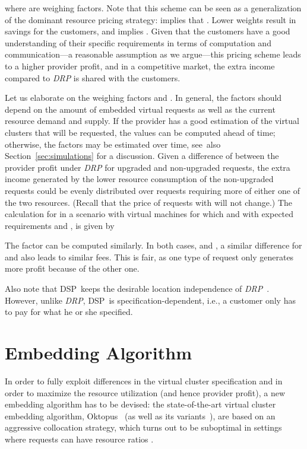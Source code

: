 \documentclass{sig-alternate-per}
\newcommand{\pricing}{\textsc{DSP}}
\begin{document}
\noindent where  are weighing factors.
Note that this scheme can be seen as a generalization of the dominant resource pricing strategy:
 implies that .
Lower weights result in savings for the customers, and  implies
.
Given that
the customers have a good understanding of their specific requirements in terms of computation and
communication---a reasonable assumption as we argue---this pricing scheme leads to a higher provider profit, and in a
competitive market,
the extra income compared to \emph{DRP}
is shared with the customers.

Let us elaborate on the weighing factors  and .
In general, the factors should depend on the amount of embedded virtual requests as well as the current resource demand
and supply.
If the provider has a good estimation of the virtual clusters that will be requested,
the values can be computed ahead of time; otherwise, the factors may be estimated over time, see~also
Section~\ref{sec:simulations}
for a discussion.
Given a difference of  between the provider profit under \emph{DRP} for upgraded and non-upgraded
requests, the extra income generated by the lower resource consumption of the non-upgraded requests could be evenly
distributed over requests requiring more of either one of the two resources.
(Recall that the price of requests with  will not change.)
The calculation for  in a scenario with  virtual machines for which  and with
expected
requirements  and , is given by

\noindent The factor  can be computed similarly.
In both cases,  and , a similar difference for  and  also leads
to similar fees. This is fair, as one type of request only generates more
profit because of the other one.

Also note that \pricing~keeps the desirable location independence of \emph{DRP}~\cite{short-ballani2011price}.
However, unlike \emph{DRP}, \pricing~is specification-dependent, i.e., a customer only has to pay
for what he or she specified.

\section{Embedding Algorithm}\label{sec:algo}

In order to fully exploit differences in the virtual cluster specification and in order
to maximize the resource utilization (and hence provider profit),
a new embedding algorithm has to be devised: the state-of-the-art virtual cluster
embedding algorithm, Oktopus~\cite{short-ballani2011towards} (as well as its variants~\cite{short-proteus}), are
based on an aggressive collocation strategy, which turns out to be suboptimal in settings where requests can have
resource ratios .
\end{document}
